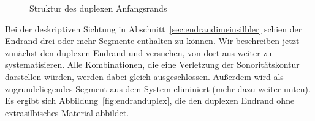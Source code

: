 
\begin{figure}[!htbp]
  \centering
  \caption{Struktur des duplexen Anfangsrands}
  \label{fig:anfangsrandduplex}
\end{figure}

Bei der deskriptiven Sichtung in Abschnitt~\ref{sec:endrandimeinsilbler} schien der Endrand drei oder mehr Segmente enthalten zu können.
Wir beschreiben jetzt zunächst den duplexen Endrand und versuchen, von dort aus weiter zu systematisieren.
Alle Kombinationen, die eine Verletzung der Sonoritätskontur darstellen würden, werden dabei gleich ausgeschlossen.
Außerdem wird \textipa{[N]} als zugrundeliegendes Segment aus dem System eliminiert (mehr dazu weiter unten).
Es ergibt sich Abbildung~\ref{fig:endranduplex}, die den duplexen Endrand ohne extrasilbisches Material abbildet.

